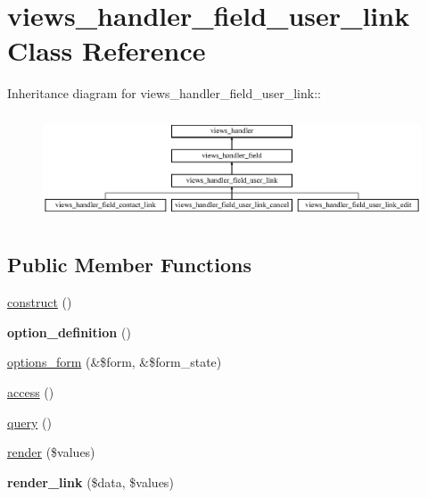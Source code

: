 \hypertarget{classviews__handler__field__user__link}{
\section{views\_\-handler\_\-field\_\-user\_\-link Class Reference}
\label{classviews__handler__field__user__link}
}
Inheritance diagram for views\_\-handler\_\-field\_\-user\_\-link::\begin{figure}[H]
\begin{center}
\leavevmode
\includegraphics[height=3.16384cm]{classviews__handler__field__user__link}
\end{center}
\end{figure}
\subsection*{Public Member Functions}
\begin{DoxyCompactItemize}
\item 
\hyperlink{classviews__handler__field__user__link_a3c0e66ff0504b344066db923819456f7}{construct} ()
\item 
\hypertarget{classviews__handler__field__user__link_a61509d4fd4bc1c98a52e550c56d42b5d}{
{\bfseries option\_\-definition} ()}
\label{classviews__handler__field__user__link_a61509d4fd4bc1c98a52e550c56d42b5d}

\item 
\hyperlink{classviews__handler__field__user__link_a952944015feaaab1fb2d0abc29d5c2b5}{options\_\-form} (\&\$form, \&\$form\_\-state)
\item 
\hyperlink{classviews__handler__field__user__link_a00708207b597556c70cba91816a03963}{access} ()
\item 
\hyperlink{classviews__handler__field__user__link_ab64eedee54360407b203c3d7474c40f2}{query} ()
\item 
\hyperlink{classviews__handler__field__user__link_af81b37cfa8e0c2363ad8ed9bb601cd14}{render} (\$values)
\item 
\hypertarget{classviews__handler__field__user__link_a72c97cafda4db75d9755835f9c73a10f}{
{\bfseries render\_\-link} (\$data, \$values)}
\label{classviews__handler__field__user__link_a72c97cafda4db75d9755835f9c73a10f}

\end{DoxyCompactItemize}


